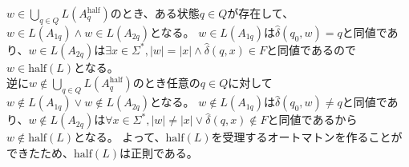 \documentclass[uplatex,dvipdfmx,a4paper,10pt]{jsarticle}
\begin{document}
\begin{enumerate}
\begin{enumerate}
                        \hspace{1em}\(w \in \bigcup_{q \in Q}L(A_{q}^{\text{half}})\)のとき、ある状態\(q \in Q\)が存在して、\(w \in L(A_{1q}) \land w \in L(A_{2q})\)となる。
                        \(w \in L(A_{1q})\)は\(\hat{\delta}(q_0, w) = q\)と同値であり、\(w \in L(A_{2q})\)は\(\exists x \in \Sigma^{*}, |w| = |x| \land \hat{\delta}(q, x) \in F\)と同値であるので\(w \in \text{half}(L)\)となる。 \\
                        \hspace{1em}逆に\(w \notin \bigcup_{q \in Q}L(A_{q}^{\text{half}})\)のとき任意の\(q \in Q\)に対して\(w \notin L(A_{1q}) \lor w \notin L(A_{2q})\)となる。
                        \(w \notin L(A_{1q})\)は\(\hat{\delta}(q_0, w) \neq q\)と同値であり、\(w \notin L(A_{2q})\)は\(\forall x \in \Sigma^{*}, |w| \neq |x| \lor \hat{\delta}(q, x) \notin F\)と同値であるから\(w \notin \text{half}(L)\)となる。
                        よって、\(\text{half}(L)\)を受理するオートマトンを作ることができたため、\(\text{half}(L)\)は正則である。
            \end{enumerate}
    \end{enumerate}



    \appendix
    \setcounter{figure}{0}
    \setcounter{table}{0}
    \renewcommand{\thetable}{\Alph{section}\arabic{table}}
    \renewcommand{\thefigure}{\Alph{section}\arabic{figure}}
    \makeatletter 
    \newcommand{\section@cntformat}{付録 \thesection:\ }
    \makeatother
    
    
\end{document}
